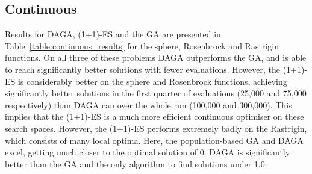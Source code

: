 \documentclass[runningheads,a4paper]{llncs}
\begin{document}
\subsection{Continuous}
Results for DAGA, (1+1)-ES and the GA are presented in Table~\ref{table:continuous_results} for the sphere, Rosenbrock and Rastrigin functions. On all three of these problems DAGA outperforms the GA, and is able to reach significantly better solutions with fewer evaluations. However, the (1+1)-ES is considerably better on the sphere and Rosenbrock functions, achieving significantly better solutions in the first quarter of evaluations (25,000 and 75,000 respectively) than DAGA can over the whole run (100,000 and 300,000). This implies that the (1+1)-ES is a much more efficient continuous optimiser on these search spaces. However, the (1+1)-ES performs extremely badly on the Rastrigin, which consists of many local optima. Here, the population-based GA and DAGA excel, getting much closer to the optimal solution of 0. DAGA is significantly better than the GA and the only algorithm to find solutions under 1.0. 
\end{document}
